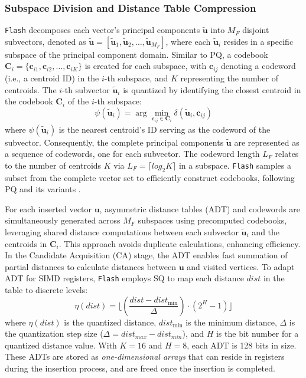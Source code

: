 \subsubsection{\textbf{Subspace Division and Distance Table Compression}}
\label{subsubsec: subspace division}
\texttt{Flash} decomposes each vector's principal components $\tilde{\boldsymbol{u}}$ into $M_{F}$ disjoint subvectors, denoted as $\tilde{\boldsymbol{u}} = [\tilde{\boldsymbol{u}}_{1}, \tilde{\boldsymbol{u}}_{2}, \ldots, \tilde{\boldsymbol{u}}_{M_{F}}]$, where each $\tilde{\boldsymbol{u}}_{i}$ resides in a specific subspace of the principal component domain. Similar to PQ, a codebook $\boldsymbol{C}_i = \{\boldsymbol{c}_{i1}, \boldsymbol{c}_{i2}, \ldots, \boldsymbol{c}_{iK}\}$ is created for each subspace, with $\boldsymbol{c}_{ij}$ denoting a codeword (i.e., a centroid ID) in the $i$-th subspace, and $K$ representing the number of centroids. The $i$-th subvector $\tilde{\boldsymbol{u}}_{i}$ is quantized by identifying the closest centroid in the codebook $\boldsymbol{C}_i$ of the $i$-th subspace:
\begin{equation}
\psi(\tilde{\boldsymbol{u}}_{i}) = \arg \min_{\boldsymbol{c}_{ij} \in \boldsymbol{C}_i} \delta( \tilde{\boldsymbol{u}}_{i}, \boldsymbol{c}_{ij} )
\end{equation}
where $\psi(\tilde{\boldsymbol{u}}_{i})$ is the nearest centroid's ID serving as the codeword of the subvector. Consequently, the complete principal components $\tilde{\boldsymbol{u}}$ are represented as a sequence of codewords, one for each subvector. The codeword length $L_F$ relates to the number of centroids $K$ via $L_F=\lceil log_2{K} \rceil$ in a subspace. \texttt{Flash} samples a subset from the complete vector set to efficiently construct codebooks, following PQ and its variants \cite{PQ,OPQ}.

For each inserted vector $\boldsymbol{u}$, asymmetric distance tables (ADT) and codewords are simultaneously generated across $M_{F}$ subspaces using precomputed codebooks, leveraging shared distance computations between each subvector $\tilde{\boldsymbol{u}}_{i}$ and the centroids in $\boldsymbol{C}_i$.
This approach avoids duplicate calculations, enhancing efficiency. In the Candidate Acquisition (CA) stage, the ADT enables fast summation of partial distances to calculate distances between $\boldsymbol{u}$ and visited vertices.
To adapt ADT for SIMD registers, \texttt{Flash} employs SQ to map each distance $dist$ in the table to discrete levels:
\begin{equation}
\eta(dist) = \Big\lfloor \left(\frac{dist - dist_{\min}}{\Delta}\right) \cdot (2^{H}-1) \Big\rfloor
\end{equation}
where $\eta(dist)$ is the quantized distance, $dist_{\min}$ is the minimum distance, $\Delta$ is the quantization step size ($\Delta=dist_{max}-dist_{min}$), and $H$ is the bit number for a quantized distance value. {With $K=16$ and $H=8$, each ADT is 128 bits in size. These ADTs are stored as \textit{one-dimensional arrays} that can reside in registers during the insertion process, and are freed once the insertion is completed.}

